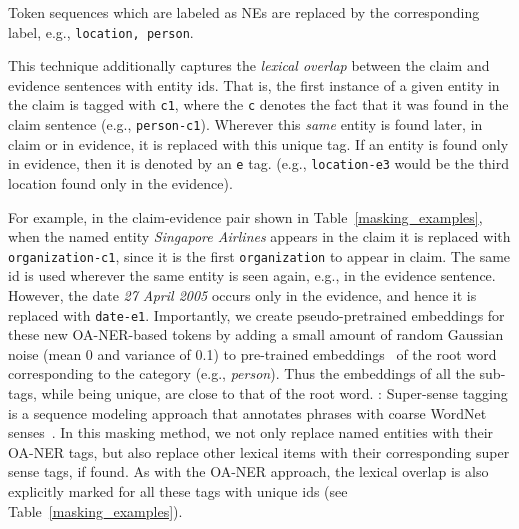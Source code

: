 {}  Token sequences which are labeled as NEs are replaced by the corresponding label, e.g., \texttt{location, person}.

{} This technique additionally captures the \textit{lexical overlap} between the claim and evidence sentences with entity ids.
That is, the first instance of a given entity in the claim is tagged with \texttt{c1}, where the \texttt{c} denotes the fact that it was found in the claim sentence (e.g., \texttt{person-c1}). Wherever this {\em same} entity is found later, in claim or in evidence, it is replaced with this unique tag. If an entity is found only in evidence, then it is denoted by an \texttt{e} tag. (e.g., \texttt{location-e3} would be the third location found only in the evidence).

For example, in the claim-evidence pair shown in Table~\ref{masking_examples}, when the named entity \textit{Singapore Airlines} appears in the claim it is replaced with \texttt{organization-c1}, since it is the first \texttt{organization} to appear in claim.
The same id is used wherever the same entity is seen again, e.g., in the evidence sentence. However, the date \textit{27 April 2005} occurs only in the evidence, and hence it is replaced with \texttt{date-e1}.
Importantly, we create pseudo-pretrained embeddings for these new OA-NER-based tokens by adding a small amount of random Gaussian noise (mean 0 and variance of 0.1) to pre-trained embeddings~\citep{pennington2014glove} of the root word corresponding to the category (e.g., \textit{person}). Thus the embeddings of all the sub-tags, while being unique, are close to that of the root word.
{}:
Super-sense tagging is a sequence modeling approach that annotates phrases with coarse WordNet senses~\citep{ciaramita2003supersense,miller1990introduction}. In this masking method, we not only replace named entities with their OA-NER tags, but also replace other lexical items with their corresponding super sense tags, if found. As with the OA-NER approach, the lexical overlap is also explicitly marked for all these tags with unique ids (see Table~\ref{masking_examples}).


